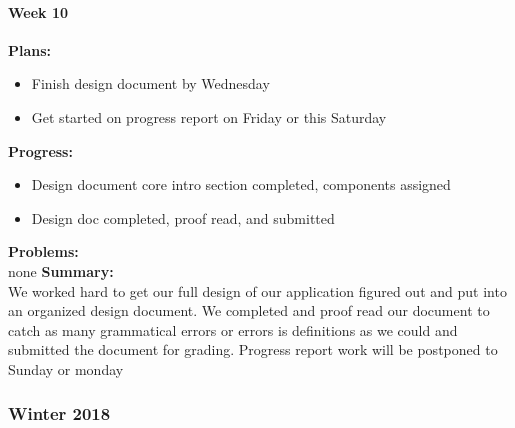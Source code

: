 \paragraph{Week 10}
\begin{adjustwidth}{2.5em}{0pt}
    \vspace{-0.5cm}\textbf{Plans:}
    \vspace{-0.5cm}
    \begin{itemize}
        \item Finish design document by Wednesday
        \item Get started on progress report on Friday or this Saturday
    \end{itemize} 
    \vspace{-0.3cm}\textbf{Progress:}
    \vspace{-0.5cm}
    \begin{itemize}
        \item Design document core intro section completed, components assigned
        \item Design doc completed, proof read, and submitted

    \end{itemize} 
    \vspace{-0.3cm}\textbf{Problems:}\\
	none
    \vspace{-0.3cm}\noindent\textbf{Summary:}\\
    \noindent We worked hard to get our full design of our application figured out and put into an organized design document. We completed and proof read our document to catch as many grammatical errors or errors is definitions as we could and submitted the document for grading. Progress report work will be postponed to Sunday or monday
	\end{adjustwidth} 
\subsubsection{Winter 2018}
